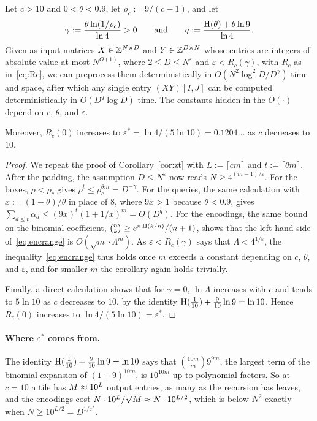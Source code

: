 \begin{corollary}\label{cor:tradeoff}
Let $c>10$ and $0<\theta<0.9$, let $\rho_c:=9/(c-1)$, and let
\[
\gamma:=\frac{\theta\ln(1/\rho_c)}{\ln4}>0\qquad\text{and}\qquad q:=\frac{\operatorname{H}(\theta)+\theta\ln9}{\ln4} .
\]
Given as input matrices $X\in\mathbb{Z}^{N\times D}$ and $Y\in\mathbb{Z}^{D\times N}$ whose entries are integers of absolute value at most $N^{O(1)}$, where $2\le D\le N^{\varepsilon}$ and $\varepsilon<R_c(\gamma)$, with $R_c$ as in~\eqref{eq:Rc}, we can preprocess them deterministically in $O(N^2\log^2\!D/D^{\gamma})$ time and space, after which any single entry $(XY)[I,J]$ can be computed deterministically in $O(D^{q}\log D)$ time. The constants hidden in the $O(\cdot)$ depend on $c$, $\theta$, and $\varepsilon$.

Moreover, $R_c(0)$ increases to $\varepsilon^*=\ln4/(5\ln10)=0.1204\ldots$ as $c$ decreases to $10$.
\end{corollary}


\begin{proof}
We repeat the proof of Corollary~\ref{cor:zt} with $L:=\lceil cm\rceil$ and $t:=\lceil\theta m\rceil$. After the padding, the assumption $D\le N^{\varepsilon}$ now reads $N\ge4^{(m-1)/\varepsilon}$. For the boxes, $\rho<\rho_c$ gives $\rho^t\le\rho_c^{\theta m}=D^{-\gamma}$. For the queries, the same calculation with $x:=(1-\theta)/\theta$ in place of $8$, where $9x>1$ because $\theta<0.9$, gives $\sum_{d\le t}\alpha_d\le(9x)^t(1+1/x)^m=O(D^{q})$. For the encodings, the same bound on the binomial coefficient, $\binom nk\ge e^{n\operatorname{H}(k/n)}/(n+1)$, shows that the left-hand side of~\eqref{eq:encrange} is $O(\sqrt m\cdot\Lambda^m)$. As $\varepsilon<R_c(\gamma)$ says that $\Lambda<4^{1/\varepsilon}$, the inequality~\eqref{eq:encrange} thus holds once $m$ exceeds a constant depending on $c$, $\theta$, and $\varepsilon$, and for smaller $m$ the corollary again holds trivially.

Finally, a direct calculation shows that for $\gamma=0$, $\ln\Lambda$ increases with $c$ and tends to $5\ln10$ as $c$ decreases to $10$, by the identity $\operatorname{H}(\frac1{10})+\frac9{10}\ln9=\ln10$. Hence $R_c(0)$ increases to $\ln4/(5\ln10)=\varepsilon^*$.
\end{proof}

\paragraph{Where $\varepsilon^*$ comes from.}
The identity $\operatorname{H}(\frac1{10})+\frac9{10}\ln9=\ln10$ says that $\binom{10m}m9^{9m}$, the largest term of the binomial expansion of $(1+9)^{10m}$, is $10^{10m}$ up to polynomial factors. So at $c=10$ a tile has $M\approx10^L$ output entries, as many as the recursion has leaves, and the encodings cost $N\cdot10^L/\sqrt{M}\approx N\cdot10^{L/2}$, which is below $N^2$ exactly when $N\ge10^{L/2}=D^{1/\varepsilon^*}$.

